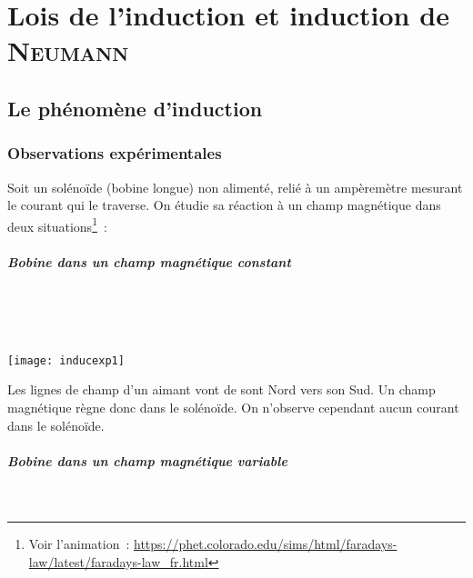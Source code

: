 \documentclass[../main/main.tex]{subfiles}
\begin{document}
\setcounter{chapter}{2}
\chapter{Lois de l'induction et induction de \textsc{Neumann}}
\label{ch:loisinduc}


\section{Le phénomène d'induction}
\label{sec:phinduc}
\subsection{Observations expérimentales}
\label{ssec:inducobsexp}

Soit un solénoïde (bobine longue) non alimenté, relié à un ampèremètre mesurant
le courant qui le traverse. On étudie sa réaction à un champ magnétique dans
deux situations\footnote{Voir l'animation~:
	\url{https://phet.colorado.edu/sims/html/faradays-law/latest/faradays-law_fr.html}}~:

\paragraph*{Bobine dans un champ magnétique constant}~
\smallbreak

\noindent
\begin{minipage}[t]{.4\linewidth}
	~
	\vspace*{-25pt}
	\begin{center}
		\texttt{[image: inducexp1]}
		\label{fig:inducexp1}
	\end{center}
\end{minipage}
\hfill
\begin{minipage}[t]{.55\linewidth}
	Les lignes de champ d'un aimant vont de sont Nord vers son Sud. Un champ
	magnétique règne donc dans le solénoïde. On n'observe cependant aucun courant
	dans le solénoïde.
\end{minipage}

\paragraph*{Bobine dans un champ magnétique variable}~
\smallbreak
\end{document}

